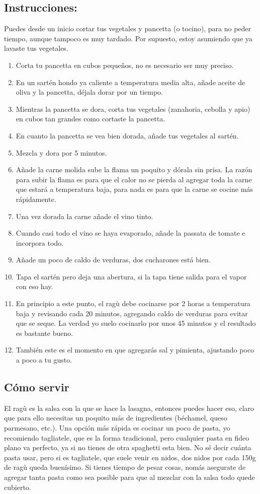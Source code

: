 \documentclass{book}
\begin{document}
\subsection*{Instrucciones:}
Puedes desde un inicio cortar tus vegetales y pancetta (o tocino), para no peder tiempo, aunque tampoco es muy tardado.
Por supuesto, estoy asumiendo que ya lavaste tus vegetales.
\begin{enumerate}
	\item Corta tu pancetta en cubos pequeños, no es necesario ser muy preciso.
	\item En un sartén hondo ya caliente a temperatura media alta, añade aceite de oliva y la pancetta, déjala dorar por un tiempo.
	\item Mientras la pancetta se dora, corta tus vegetales (zanahoria, cebolla y apio) en cubos tan grandes como cortaste la pancetta.
	\item En cuanto la pancetta se vea bien dorada, añade tus vegetales al sartén.
	\item Mezcla y dora por 5 minutos.
	\item Añade la carne molida sube la flama un poquito y dórala sin prisa. La razón para subir la flama es para que el calor no se pierda al agregar toda la carne que estará a temperatura baja, para nada es para que la carne se cocine más rápidamente.
	\item Una vez dorada la carne añade el vino tinto.
	\item Cuando casi todo el vino se haya evaporado, añade la passata de tomate e incorpora todo.
	\item Añade un poco de caldo de verduras, dos cucharones está bien.
	\item Tapa el sartén pero deja una abertura, si la tapa tiene salida para el vapor con eso hay.
	\item En principio a este punto, el ragù debe cocinarse por 2 horas a temperatura baja y revisando cada 20 minutos, agregando caldo de verduras para evitar que se seque. La verdad yo suelo cocinarlo por unos 45 minutos y el resultado es bastante bueno.
	\item También este es el momento en que agregarás sal y pimienta, ajustando poco a poco a tu gusto.
\end{enumerate}

\subsection*{Cómo servir}
El ragù es la salsa con la que se hace la lasagna, entonces puedes hacer eso, claro que para ello necesitas un poquito más de ingredientes (béchamel, queso parmesano, etc.).
Una opción más rápida es cocinar un poco de pasta, yo recomiendo tagliatele, que es la forma tradicional, pero cualquier pasta en fideo plano va perfecto, ya si no tienes de otra spaghetti esta bien.
No sé decir cuánta pasta usar, pero si es tagliatele, que suele venir en nidos, dos nidos por cada 150g de ragù queda buenísimo. 
Si tienes tiempo de pesar cosas, nomás asegurate de agregar tanta pasta como sea posible para que al mezclar con la salsa todo quede cubierto.
\end{document}
